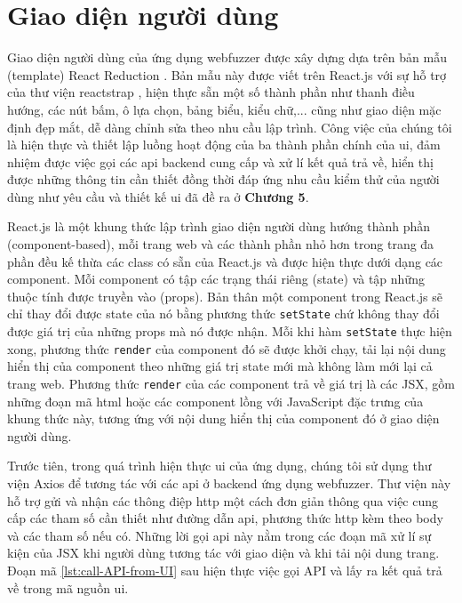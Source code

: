 \section{Giao diện người dùng}
Giao diện người dùng của ứng dụng webfuzzer được xây dựng dựa trên bản mẫu (template) React Reduction \parencite{react-reduction-github}. Bản mẫu này được viết trên React.js với sự hỗ trợ của thư viện reactstrap \parencite{reactstrap}, hiện thực sẵn một số thành phần như thanh điều hướng, các nút bấm, ô lựa chọn, bảng biểu, kiểu chữ,... cũng như giao diện mặc định đẹp mắt, dễ dàng chỉnh sửa theo nhu cầu lập trình. Công việc của chúng tôi là hiện thực và thiết lập luồng hoạt động của ba thành phần chính của \acrshort{ui}, đảm nhiệm được việc gọi các \acrshort{api} backend cung cấp và xử lí kết quả trả về, hiển thị được những thông tin cần thiết đồng thời đáp ứng nhu cầu kiểm thử của người dùng như yêu cầu và thiết kế \acrshort{ui} đã đề ra ở \textbf{Chương 5}.\par
React.js là một khung thức lập trình giao diện người dùng hướng thành phần (component-based), mỗi trang web và các thành phần nhỏ hơn trong trang đa phần đều kế thừa các class có sẵn của React.js và được hiện thực dưới dạng các component. Mỗi component có tập các trạng thái riêng (state) và tập những thuộc tính được truyền vào (props). Bản thân một component trong React.js sẽ chỉ thay đổi được state của nó bằng phương thức \texttt{setState} chứ không thay đổi được giá trị của những props mà nó được nhận. Mỗi khi hàm \texttt{setState} thực hiện xong, phương thức \texttt{render} của component đó sẽ được khởi chạy, tải lại nội dung hiển thị của component theo những giá trị state mới mà không làm mới lại cả trang web. Phương thức \texttt{render} của các component trả về giá trị là các JSX, gồm những đoạn mã \acrshort{html} hoặc các component lồng với JavaScript đặc trưng của khung thức này, tương ứng với nội dung hiển thị của component đó ở giao diện người dùng.\par
Trước tiên, trong quá trình hiện thực \acrshort{ui} của ứng dụng, chúng tôi sử dụng thư viện Axios \parencite{axios-npm} để tương tác với các \acrshort{api} ở backend ứng dụng webfuzzer. Thư viện này hỗ trợ gửi và nhận các thông điệp \acrshort{http} một cách đơn giản thông qua việc cung cấp các tham số cần thiết như đường dẫn \acrshort{api}, phương thức \acrshort{http} kèm theo body và các tham số nếu có. Những lời gọi \acrshort{api} này nằm trong các đoạn mã xử lí sự kiện của JSX khi người dùng tương tác với giao diện và khi tải nội dung trang. Đoạn mã \ref{lst:call-API-from-UI} sau hiện thực việc gọi API và lấy ra kết quả trả về trong mã nguồn \acrshort{ui}.
